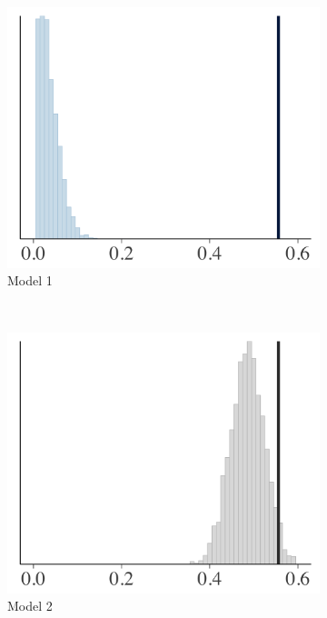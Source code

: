 \documentclass{statsoc}
\begin{document}
\begin{figure}
\centering
\begin{subfigure}{0.31\textwidth}
\includegraphics[width=\textwidth]{ppc_skew1.png}
\caption{Model 1}
\label{fig:ppc_skew0}
\end{subfigure}
~
\begin{subfigure}{0.31\textwidth}
\includegraphics[width=\textwidth]{ppc_skew2.png}
\caption{Model 2}
\label{fig:ppc_skew2}
\end{subfigure}
~
\begin{subfigure}{0.31\textwidth}

\end{subfigure}
\end{figure}
\end{document}
